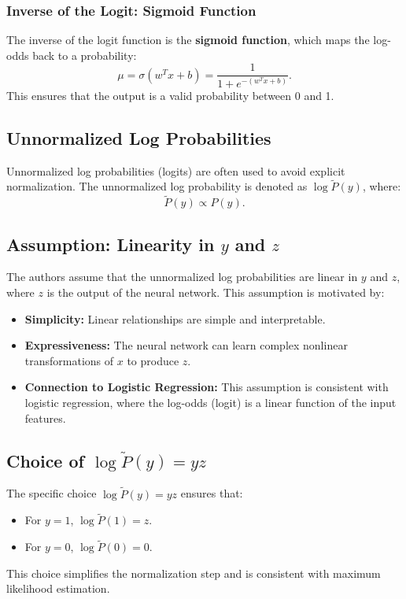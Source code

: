 \begin{notechapter}
\subsubsection{Inverse of the Logit: Sigmoid Function}
The inverse of the logit function is the \textbf{sigmoid function}, which maps the log-odds back to a probability:
\[
\mu = \sigma(w^T x + b) = \frac{1}{1 + e^{-(w^T x + b)}}.
\]
This ensures that the output is a valid probability between 0 and 1.

\subsection{Unnormalized Log Probabilities}
Unnormalized log probabilities (logits) are often used to avoid explicit normalization. The unnormalized log probability is denoted as \( \log \tilde{P}(y) \), where:
\[
\tilde{P}(y) \propto P(y).
\]

\subsection{Assumption: Linearity in \( y \) and \( z \)}
The authors assume that the unnormalized log probabilities are linear in \( y \) and \( z \), where \( z \) is the output of the neural network. This assumption is motivated by:
\begin{itemize}
    \item \textbf{Simplicity:} Linear relationships are simple and interpretable.
    \item \textbf{Expressiveness:} The neural network can learn complex nonlinear transformations of \( x \) to produce \( z \).
    \item \textbf{Connection to Logistic Regression:} This assumption is consistent with logistic regression, where the log-odds (logit) is a linear function of the input features.
\end{itemize}

\subsection{Choice of \( \log \tilde{P}(y) = yz \)}
The specific choice \( \log \tilde{P}(y) = yz \) ensures that:
\begin{itemize}
    \item For \( y = 1 \), \( \log \tilde{P}(1) = z \).
    \item For \( y = 0 \), \( \log \tilde{P}(0) = 0 \).
\end{itemize}
This choice simplifies the normalization step and is consistent with maximum likelihood estimation.


\end{notechapter}
